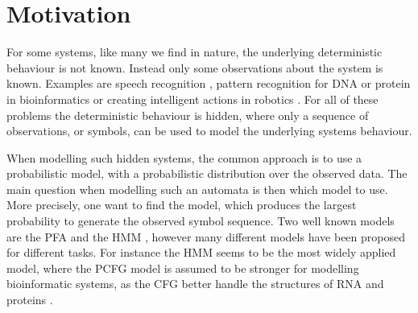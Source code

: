 \section{Motivation}
For some systems, like many we find in nature, the underlying deterministic behaviour is not known. Instead only some observations about the system is known. Examples are speech recognition \cite{Rabiner89hmm}, pattern recognition for DNA or protein in bioinformatics \cite{Sakakibara2005} or creating intelligent actions in robotics \cite{Rivest1993}. For all of these problems the deterministic behaviour is hidden, where only a sequence of observations, or symbols, can be used to model the underlying systems behaviour.

When modelling such hidden systems, the common approach is to use a probabilistic model, with a probabilistic distribution over the observed data. The main question when modelling such an automata is then which model to use. More precisely, one want to find the model, which produces the largest probability to generate the observed symbol sequence. Two well known models are the PFA \cite{pazintroduction} and the HMM \cite{Rabiner89hmm}, however many different models have been proposed for different tasks. For instance the HMM seems to be the most widely applied model, where the PCFG model is assumed to be stronger for modelling bioinformatic systems, as the CFG better handle the structures of RNA and proteins \cite{Sakakibara2005}.
